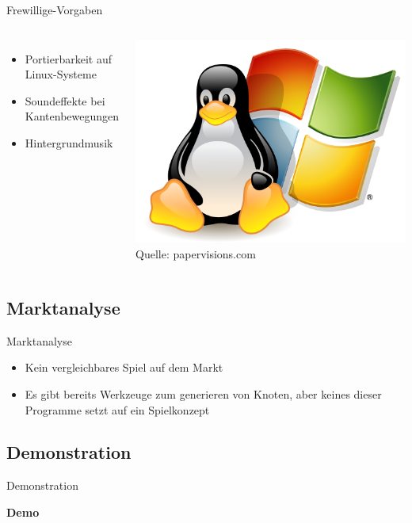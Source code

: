 \documentclass[18pt]{beamer}
\begin{document}
\begin{frame}{Frewillige-Vorgaben}

\begin{columns}[c] 
    \begin{itemize}
	\item Portierbarkeit auf Linux-Systeme
	\item Soundeffekte bei Kantenbewegungen
	\item Hintergrundmusik
	\end{itemize}
    \includegraphics[width=\textwidth]{linux} \\
    Quelle: papervisions.com
    \end{columns}
\end{frame}

\subsection{Marktanalyse}
\begin{frame}{Marktanalyse}

\begin{itemize}
\item Kein vergleichbares Spiel auf dem Markt
\item Es gibt bereits Werkzeuge zum generieren von Knoten, aber keines dieser Programme setzt auf ein Spielkonzept

\end{itemize}
\end{frame}

\subsection{Demonstration}
\begin{frame}{Demonstration}
\begin{center}
\Huge \textbf{Demo}
\end{center}

\end{frame}
\end{document}
